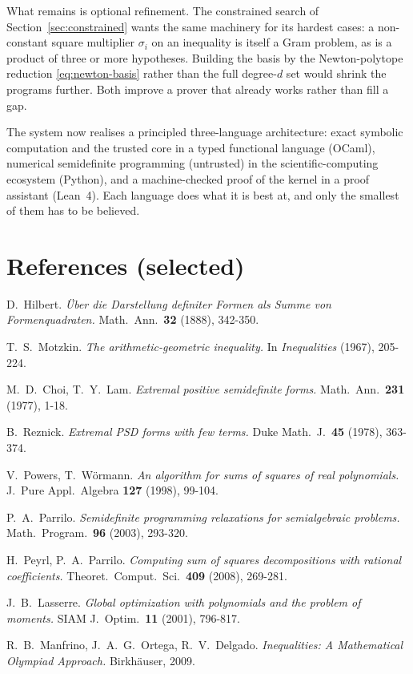 \documentclass[11pt]{article}
\theoremstyle{definition}
\theoremstyle{plain}
\begin{document}
\smallskip
\noindent What remains is optional refinement. The constrained search of
Section~\ref{sec:constrained} wants the same machinery for its hardest cases: a
non-constant square multiplier $\sigma_i$ on an inequality is itself a Gram
problem, as is a product of three or more hypotheses. Building the basis by the
Newton-polytope reduction \eqref{eq:newton-basis} rather than the full
degree-$d$ set would shrink the programs further. Both improve a prover that
already works rather than fill a gap.

The system now realises a principled three-language architecture: exact symbolic
computation and the trusted core in a typed functional language (OCaml),
numerical semidefinite programming (untrusted) in the scientific-computing
ecosystem (Python), and a machine-checked proof of the kernel in a proof
assistant (Lean~4). Each language does what it is best at, and only the smallest
of them has to be believed.

\section*{References (selected)}
\begin{enumerate}[label={[\arabic*]},leftmargin=2.2em]
  \item D.~Hilbert. \emph{Über die Darstellung definiter Formen als Summe von
    Formenquadraten.} Math.\ Ann.\ \textbf{32} (1888), 342-350.
  \item T.~S.~Motzkin. \emph{The arithmetic-geometric inequality.} In
    \emph{Inequalities} (1967), 205-224.
  \item M.~D.~Choi, T.~Y.~Lam. \emph{Extremal positive semidefinite forms.}
    Math.\ Ann.\ \textbf{231} (1977), 1-18.
  \item B.~Reznick. \emph{Extremal PSD forms with few terms.} Duke Math.\ J.\
    \textbf{45} (1978), 363-374.
  \item V.~Powers, T.~Wörmann. \emph{An algorithm for sums of squares of real
    polynomials.} J.\ Pure Appl.\ Algebra \textbf{127} (1998), 99-104.
  \item P.~A.~Parrilo. \emph{Semidefinite programming relaxations for
    semialgebraic problems.} Math.\ Program.\ \textbf{96} (2003), 293-320.
  \item H.~Peyrl, P.~A.~Parrilo. \emph{Computing sum of squares decompositions
    with rational coefficients.} Theoret.\ Comput.\ Sci.\ \textbf{409} (2008),
    269-281.
  \item J.~B.~Lasserre. \emph{Global optimization with polynomials and the
    problem of moments.} SIAM J.\ Optim.\ \textbf{11} (2001), 796-817.
  \item R.~B.~Manfrino, J.~A.~G.~Ortega, R.~V.~Delgado. \emph{Inequalities: A
    Mathematical Olympiad Approach.} Birkhäuser, 2009.
\end{enumerate}
\end{document}
